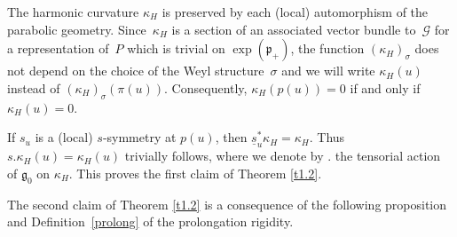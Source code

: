 \documentclass[10pt,a4paper]{amsart}
\newcommand{\ka}{\kappa}
\newcommand{\si}{\sigma}
\newcommand{\un}{\underline}
\newcommand{\ba}{\mathcal{G}}
\newcommand{\fg}{\mathfrak g}
\newcommand{\fp}{\mathfrak p}
\numberwithin{equation}{section}
\begin{document}
The harmonic curvature $\ka_H$ is preserved by each (local) automorphism of the parabolic geometry. Since~$\kappa_H$ is a section of an associated vector bundle to~$\ba$ for a representation of~$P$ which is trivial on $\exp(\fp_+)$, the function $(\kappa_H)_\si$ does not depend on the choice of the Weyl structure~$\si$ and we will write $\kappa_H(u)$ instead of $(\kappa_H)_\si(\pi(u))$. Consequently, $\kappa_H(p(u))=0$ if and only if $\kappa_H(u)=0$.

If $s_u$ is a (local) $s$-symmetry at $p(u)$, then $\un s_u^*\kappa_H=\kappa_H$. Thus $s.\kappa_H(u)=\kappa_H(u)$ trivially follows, where we denote by $.$ the tensorial action of $\fg_0$ on $\kappa_H$. This proves the f\/irst claim of Theorem \ref{t1.2}.

The second claim of Theorem \ref{t1.2} is a consequence of the following proposition and Def\/i\-ni\-tion~\ref{prolong} of the prolongation rigidity.
\end{document}
